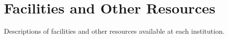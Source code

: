 \chapter{Facilities and Other Resources}
\label{sec:facilities}


\vspace{0.5in}
\noindent Descriptions of facilities and other resources available at 
each institution.

\etocsettocstyle{}{}
\etocchecksemptiness
{}

